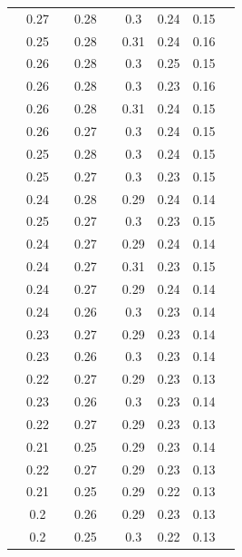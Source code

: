 \documentclass[AutoFakeBold]{LZUThesis}
\begin{document}
\begin{longtable}{ccccccccc}
      & 0.27  &       & 0.28  &       & 0.3   & 0.24 & 0.15 &       \\
      & 0.25  &       & 0.28  &       & 0.31  & 0.24 & 0.16 &       \\
      & 0.26  &       & 0.28  &       & 0.3   & 0.25 & 0.15 &       \\
      & 0.26  &       & 0.28  &       & 0.3   & 0.23 & 0.16 &       \\
      & 0.26  &       & 0.28  &       & 0.31  & 0.24 & 0.15 &       \\
      & 0.26  &       & 0.27  &       & 0.3   & 0.24 & 0.15 &       \\
      & 0.25  &       & 0.28  &       & 0.3   & 0.24 & 0.15 &       \\
      & 0.25  &       & 0.27  &       & 0.3   & 0.23 & 0.15 &       \\
      & 0.24  &       & 0.28  &       & 0.29  & 0.24 & 0.14 &       \\
      & 0.25  &       & 0.27  &       & 0.3   & 0.23 & 0.15 &       \\
      & 0.24  &       & 0.27  &       & 0.29  & 0.24 & 0.14 &       \\
      & 0.24  &       & 0.27  &       & 0.31  & 0.23 & 0.15 &       \\
      & 0.24  &       & 0.27  &       & 0.29  & 0.24 & 0.14 &       \\
      & 0.24  &       & 0.26  &       & 0.3   & 0.23 & 0.14 &       \\
      & 0.23  &       & 0.27  &       & 0.29  & 0.23 & 0.14 &       \\
      & 0.23  &       & 0.26  &       & 0.3   & 0.23 & 0.14 &       \\
      & 0.22  &       & 0.27  &       & 0.29  & 0.23 & 0.13 &       \\
      & 0.23  &       & 0.26  &       & 0.3   & 0.23 & 0.14 &       \\
      & 0.22  &       & 0.27  &       & 0.29  & 0.23 & 0.13 &       \\
      & 0.21  &       & 0.25  &       & 0.29  & 0.23 & 0.14 &       \\
      & 0.22  &       & 0.27  &       & 0.29  & 0.23 & 0.13 &       \\
      & 0.21  &       & 0.25  &       & 0.29  & 0.22 & 0.13 &       \\
      & 0.2   &       & 0.26  &       & 0.29  & 0.23 & 0.13 &       \\
      & 0.2   &       & 0.25  &       & 0.3   & 0.22 & 0.13 &       \\

\end{longtable}
\end{document}
